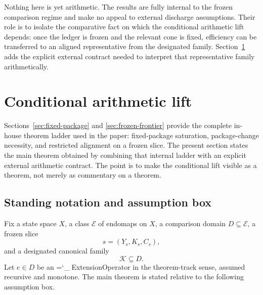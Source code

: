 \documentclass[11pt]{article}
\newcommand{\lid}[1]{{\small\ttfamily\hyphenchar\font=`\_ #1}}
\begin{document}
Nothing here is yet arithmetic. The results are fully internal to the frozen comparison regime and make no appeal to external discharge assumptions. Their role is to isolate the comparative fact on which the conditional arithmetic lift depends: once the ledger is frozen and the relevant cone is fixed, efficiency can be transferred to an aligned representative from the designated family. Section~\ref{sec:conditional-lift} adds the explicit external contract needed to interpret that representative family arithmetically.
 \section{Conditional arithmetic lift}\label{sec:conditional-lift}

Sections~\ref{sec:fixed-package} and \ref{sec:frozen-frontier} provide the complete in-house theorem ladder used in the paper: fixed-package saturation, package-change necessity, and restricted alignment on a frozen slice. The present section states the main theorem obtained by combining that internal ladder with an explicit external arithmetic contract. The point is to make the conditional lift visible as a theorem, not merely as commentary on a theorem.

\subsection*{Standing notation and assumption box}

Fix a state space $X$, a class $\mathcal{E}$ of endomaps on $X$, a comparison domain $D\subseteq \mathcal{E}$, a frozen slice
\[
s=(Y_s,K_s,C_s),
\]
and a designated canonical family
\[
\mathcal{K}\subseteq D.
\]
Let $e\in D$ be an \lid{ExtensionOperator} in the theorem-track sense, assumed recursive and monotone. The main theorem is stated relative to the following assumption box.
\end{document}
